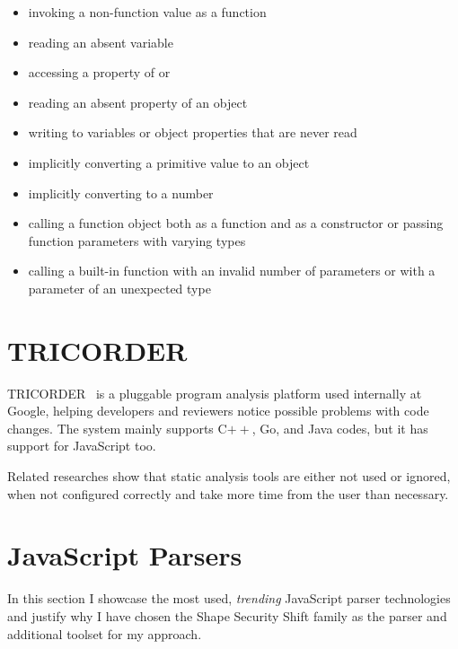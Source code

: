 \begin{itemize}[topsep=0pt]
  \item invoking a non-function value as a function
  \item reading an absent variable
  \item accessing a property of  or 
  \item reading an absent property of an object
  \item writing to variables or object properties that are never read
  \item implicitly converting a primitive value to an object
  \item implicitly converting  to a number
  \item calling a function object both as a function and as a constructor or passing function parameters with varying types
  \item calling a built-in function with an invalid number of parameters or with a parameter of an unexpected type
\end{itemize}


\section{TRICORDER}
TRICORDER~\cite{tricorder} is a pluggable program analysis platform used internally at Google, helping developers and reviewers notice possible problems with code changes. The system mainly supports C$++$, Go, and Java codes, but it has support for JavaScript too.

Related researches show that static analysis tools are either not used or ignored, when not configured correctly and take more time from the user than necessary. 


\section{JavaScript Parsers}
\label{sect:javascript-parsers}
In this section I showcase the most used, \emph{trending} JavaScript parser technologies and justify why I have chosen the Shape Security Shift family as the parser and additional toolset for my approach.

